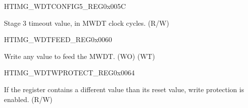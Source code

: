 \begin{register}{H}{TIMG\_WDTCONFIG5\_REG}{0x005C}\label{regdesc:TIMGWDTCONFIG5REG}
%
\regnewline%
\begin{regdesc}\begin{reglist}
\label{fielddesc:TIMGWDTSTG3HOLD}\item [TIMG\_WDT\_STG3\_HOLD] Stage 3 timeout value, in MWDT clock cycles. (R/W)
\end{reglist}\end{regdesc}
\end{register}


\begin{register}{H}{TIMG\_WDTFEED\_REG}{0x0060}\label{regdesc:TIMGWDTFEEDREG}
%
\regnewline%
\begin{regdesc}\begin{reglist}
\label{fielddesc:TIMGWDTFEED}\item [TIMG\_WDT\_FEED] Write any value to feed the MWDT. (WO) (WT)
\end{reglist}\end{regdesc}
\end{register}


\begin{register}{H}{TIMG\_WDTWPROTECT\_REG}{0x0064}\label{regdesc:TIMGWDTWPROTECTREG}
%
\regnewline%
\begin{regdesc}\begin{reglist}
\label{fielddesc:TIMGWDTWKEY}\item [TIMG\_WDT\_WKEY] If the register contains a different value than its reset value, write
protection is enabled. (R/W)
\end{reglist}\end{regdesc}
\end{register}


